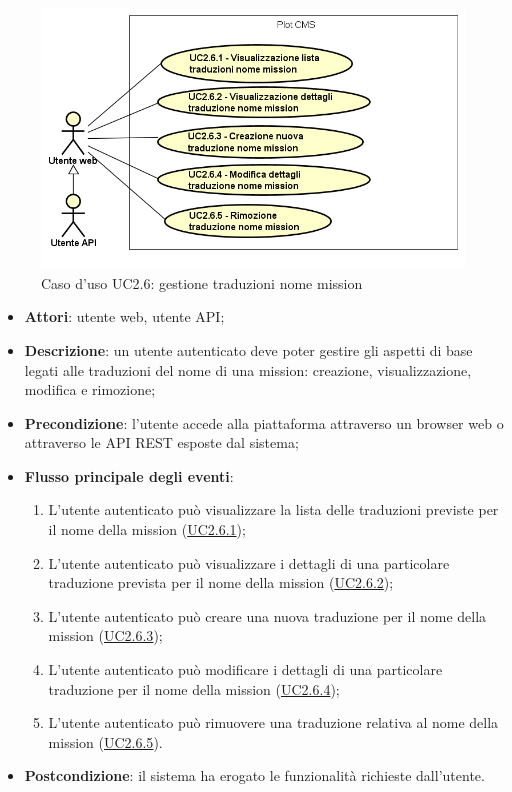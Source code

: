         \begin{figure}[H]
            \centering
            \includegraphics[scale=0.95, width=\textwidth]{immagini/usecase/UC2-6.png}
            \caption{Caso d'uso UC2.6: gestione traduzioni nome mission}\label{fig:UC2.6} 
        \end{figure}
\begin{itemize}
\item \textbf{Attori}: utente web, utente API;
\item \textbf{Descrizione}: un utente autenticato deve poter gestire gli aspetti di base legati alle traduzioni del nome di una mission: creazione, visualizzazione, modifica e rimozione; 
      \item \textbf{Precondizione}: l'utente accede alla piattaforma attraverso un browser web o attraverso le API REST esposte dal sistema;

        \item \textbf{Flusso principale degli eventi}:
          \begin{enumerate}
          \item L'utente autenticato può visualizzare la lista delle traduzioni previste per il nome della mission (\hyperlink{UC2.6.1}{UC2.6.1});
          \item L'utente autenticato può visualizzare i dettagli di una particolare traduzione prevista per il nome della mission (\hyperlink{UC2.6.2}{UC2.6.2});
          \item L'utente autenticato può creare una nuova traduzione per il nome della mission (\hyperlink{UC2.6.3}{UC2.6.3});
          \item L'utente autenticato può modificare i dettagli di una particolare traduzione per il nome della mission (\hyperlink{UC2.6.4}{UC2.6.4});
          \item L'utente autenticato può rimuovere una traduzione relativa al nome della mission (\hyperlink{UC2.6.5}{UC2.6.5}).

      \end{enumerate}
    \item \textbf{Postcondizione}: il sistema ha erogato le funzionalità richieste dall'utente.
  \end{itemize}
\hypertarget{UC2.6.1}{}
